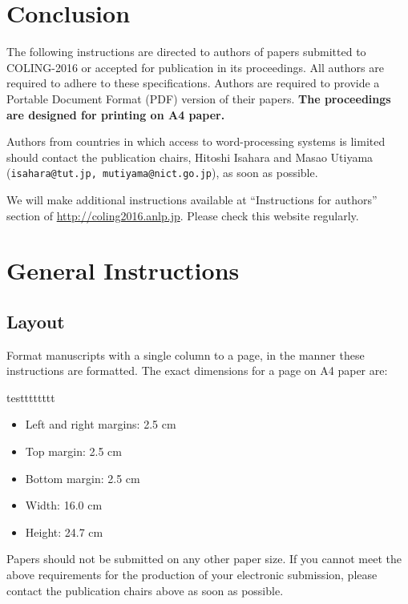 \documentclass[11pt]{article}
\begin{document}
\section{Conclusion}


%
% 

The following instructions are directed to authors of papers submitted
to COLING-2016 or accepted for publication in its proceedings. All
authors are required to adhere to these specifications. Authors are
required to provide a Portable Document Format (PDF) version of their
papers. \textbf{The proceedings are designed for printing on A4
  paper.}

Authors from countries in which access to word-processing systems is
limited should contact the publication chairs,
Hitoshi Isahara and Masao Utiyama
(\texttt{isahara@tut.jp, mutiyama@nict.go.jp}),
as soon as possible.

We will make additional instructions available at ``Instructions for authors'' section of 
\url{http://coling2016.anlp.jp}. Please check
this website regularly.

\section{General Instructions}
\subsection{Layout}
\label{ssec:layout}

Format manuscripts with a single column to a page, in the manner these
instructions are formatted. The exact dimensions for a page on A4
paper are:

testttttttt

\begin{itemize}
\item Left and right margins: 2.5 cm
\item Top margin: 2.5 cm
\item Bottom margin: 2.5 cm
\item Width: 16.0 cm
\item Height: 24.7 cm
\end{itemize}

\noindent Papers should not be submitted on any other paper size.
If you cannot meet the above requirements for
the production of your electronic submission, please contact the
publication chairs above as soon as possible.
\end{document}
